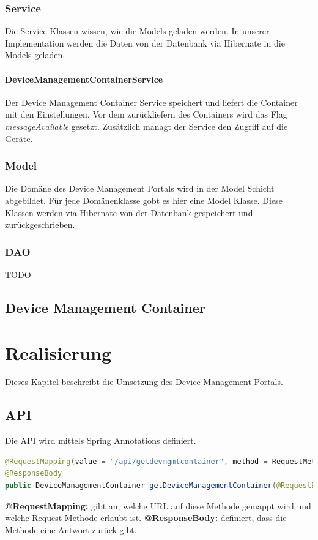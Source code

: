 \subsubsection{Service}
Die Service Klassen wissen, wie die Models geladen werden. In unserer Implementation werden die Daten von der Datenbank via Hibernate in die Models geladen.

\paragraph{DeviceManagementContainerService}
Der Device Management Container Service speichert und liefert die Container mit den Einstellungen. Vor dem zurückliefern des Containers wird das Flag \textit{messageAvailable} gesetzt. Zusätzlich managt der Service den Zugriff auf die Geräte. 

\subsubsection{Model}
Die Domäne des Device Management Portals wird in der Model Schicht abgebildet. Für jede Domänenklasse gobt es hier eine Model Klasse. Diese Klassen werden via Hibernate von der Datenbank gespeichert und zurückgeschrieben.

\subsubsection{DAO}
TODO

\subsection{Device Management Container}

\section{Realisierung}
Dieses Kapitel beschreibt die Umsetzung des Device Management Portals.

\subsection{API}
Die API wird mittels Spring Annotations definiert. 

\begin{lstlisting}[language=Java, caption=Spring Annotation]
@RequestMapping(value = "/api/getdevmgmtcontainer", method = RequestMethod.POST)
@ResponseBody
public DeviceManagementContainer getDeviceManagementContainer(@RequestBody final StatusData request)

\end{lstlisting}
\textbf{@RequestMapping:} gibt an, welche URL auf diese Methode gemappt wird und welche Request Methode erlaubt ist.
\textbf{@ResponseBody: } definiert, dass die Methode eine Antwort zurück gibt.



